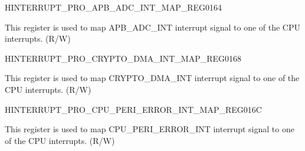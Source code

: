 \begin{register}{H}{INTERRUPT\_PRO\_APB\_ADC\_INT\_MAP\_REG}{\hexprefix{}0164}\label{regdesc:INTERRUPTPROAPBADCINTMAPREG}
%
%
\regnewline%
\begin{regdesc}\begin{reglist}
\label{fielddesc:INTERRUPTPROAPBADCINTMAP}\item [INTERRUPT\_PRO\_APB\_ADC\_INT\_MAP] This register is used to map APB\_ADC\_INT interrupt signal to one of the CPU interrupts. (R/W)
\end{reglist}\end{regdesc}
\end{register}


\begin{register}{H}{INTERRUPT\_PRO\_CRYPTO\_DMA\_INT\_MAP\_REG}{\hexprefix{}0168}\label{regdesc:INTERRUPTPROCRYPTODMAINTMAPREG}
%
%
\regnewline%
\begin{regdesc}\begin{reglist}
\label{fielddesc:INTERRUPTPROCRYPTODMAINTMAP}\item [INTERRUPT\_PRO\_CRYPTO\_DMA\_INT\_MAP] This register is used to map CRYPTO\_DMA\_INT interrupt signal to one of the CPU interrupts. (R/W)
\end{reglist}\end{regdesc}
\end{register}


\begin{register}{H}{INTERRUPT\_PRO\_CPU\_PERI\_ERROR\_INT\_MAP\_REG}{\hexprefix{}016C}\label{regdesc:INTERRUPTPROCPUPERIERRORINTMAPREG}
%
%
\regnewline%
\begin{regdesc}\begin{reglist}
\label{fielddesc:INTERRUPTPROCPUPERIERRORINTMAP}\item [INTERRUPT\_PRO\_CPU\_PERI\_ERROR\_INT\_MAP] This register is used to map CPU\_PERI\_ERROR\_INT interrupt signal to one of the CPU interrupts. (R/W)
\end{reglist}\end{regdesc}
\end{register}


